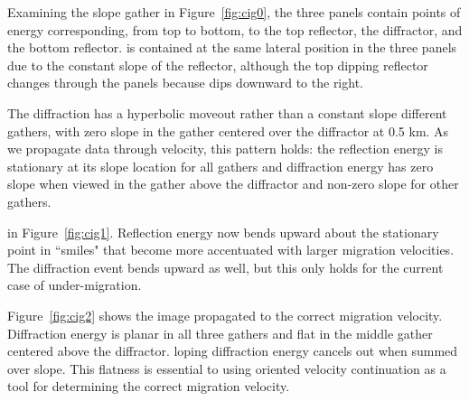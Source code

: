 Examining the slope gather in Figure~\ref{fig:cig0},
the three panels contain points of energy corresponding, from top to bottom,
to the top reflector, the diffractor, and the bottom reflector. 
 is contained at the same lateral position in the three panels due to the constant slope of the reflector, although the top dipping reflector changes through the panels because  dips downward to the right.
\par
The diffraction has a hyperbolic moveout rather than a constant slope  different gathers, with zero slope in the gather centered over the diffractor at 0.5 km.  As we propagate data through velocity, this pattern holds: the reflection energy is stationary at its slope location for all gathers and diffraction energy has zero slope when viewed in the gather above the diffractor and non-zero slope for other gathers.
\par
{} in Figure~\ref{fig:cig1}.
Reflection energy now bends upward about the stationary point in ``smiles" that become
more accentuated with larger migration velocities. The diffraction event bends upward as well,
but this only holds for the current case of under-migration.  
\par
Figure~\ref{fig:cig2} shows the image propagated to the correct migration velocity.
Diffraction energy is planar in all three gathers and flat in the middle gather centered above the diffractor.
loping diffraction energy cancels out when summed over slope.
This flatness is essential to using oriented velocity continuation as a tool for determining the correct migration velocity.  

